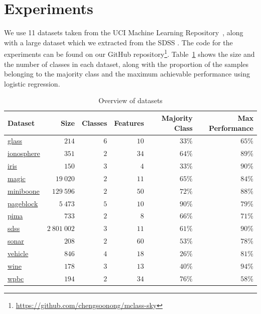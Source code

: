 \documentclass[fleqn,10pt,lineno]{wlpeerj} %
\begin{document}
\section{Experiments}\label{sec:expt}

We use 11 datasets taken from the UCI Machine Learning
Repository~\citep{lichman13}, along with a large dataset which we extracted
from the SDSS \citep{alam15}. The code for the experiments can be found on our
GitHub repository\footnote{\url{https://github.com/chengsoonong/mclass-sky}}.
Table~\ref{tab:datasets} shows the size and the number of classes in each
dataset, along with the proportion of the samples belonging to the majority
class and the maximum achievable performance using logistic regression.

\begin{table}[htbp]
	\caption {Overview of datasets} \label{tab:datasets}
	\centering
	\begin{tabular}{lrrrrr}
		\toprule
		{Dataset}  & Size &  Classes & Features & Majority Class & Max Performance \\
		\midrule
        \href{https://archive.ics.uci.edu/ml/datasets/Glass+Identification}{glass}
        	& $214$ & $6$ & $10$ & $33\%$ & $65\%$ \\
		\href{https://archive.ics.uci.edu/ml/datasets/Ionosphere}{ionosphere}
			& $351$ & $2$ & $34$ & $64\%$ & $89\%$ \\
		\href{https://archive.ics.uci.edu/ml/datasets/Iris}{iris}
        	& $150$ & $3$ & $4$ & $33\%$ & $90\%$ \\
        \href{https://archive.ics.uci.edu/ml/datasets/MAGIC+Gamma+Telescope}{magic}
        	& $19~020$ & $2$ & $11$ & $65\%$ & $84\%$ \\
        \href{https://archive.ics.uci.edu/ml/datasets/MiniBooNE+particle+identification}{miniboone}
        	& $129~596$ & $2$ & $50$ & $72\%$ & $88\%$ \\
        \href{https://archive.ics.uci.edu/ml/datasets/Page+Blocks+Classification}{pageblock}
        	& $5~473$ & $5$ & $10$ & $90\%$ & $79\%$ \\
		\href{https://archive.ics.uci.edu/ml/datasets/Pima+Indians+Diabetes}{pima}
        	& $733$ & $2$ & $8$ & $66\%$ & $71\%$ \\
        \href{http://dx.doi.org/10.5281/zenodo.58500}{sdss}
        	& $2~801~002$ & $3$ & $11$ & $61\%$ & $90\%$ \\
		\href{https://archive.ics.uci.edu/ml/datasets/Connectionist+Bench+(Sonar,+Mines+vs.+Rocks)}{sonar}
        	& $208$ & $2$ & $60$ & $53\%$ & $78\%$ \\
        \href{https://archive.ics.uci.edu/ml/datasets/Statlog+(Vehicle+Silhouettes)}{vehicle}
			& $846$ & $4$ & $18$ & $26\%$ & $81\%$ \\
		\href{https://archive.ics.uci.edu/ml/datasets/Wine}{wine}
        	& $178$ & $3$ & $13$ & $40\%$ & $94\%$ \\
		\href{https://archive.ics.uci.edu/ml/datasets/Breast+Cancer+Wisconsin+(Prognostic)}{wpbc}
        	& $194$ & $2$ & $34$ & $76\%$ & $58\%$ \\
		\bottomrule
	\end{tabular}
\end{table}
\end{document}
